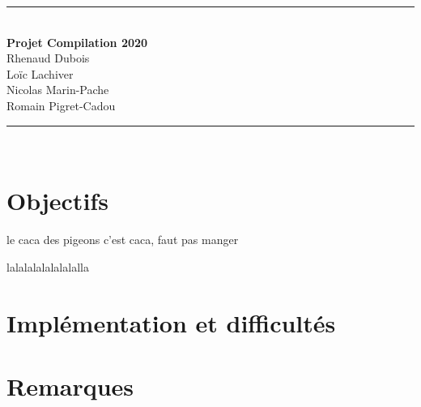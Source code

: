 \documentclass[12pt, a4paper]{article}
\begin{document}


\begin{center}
    \rule{\linewidth}{0.5mm} \\
    \Large\textbf{Projet Compilation 2020\\}
    Rhenaud Dubois\\
    Loïc Lachiver\\
    Nicolas Marin-Pache\\
    Romain Pigret-Cadou
    
    \rule{\linewidth}{0.5mm} \\
\end{center}



\section{Objectifs}
le caca des pigeons c'est caca, faut pas manger
\begin{codequote}
    lalalalalalalalalla
\end{codequote}
\vspace{1cm}


\section{Implémentation et difficultés}






\section{Remarques}
\end{document}
